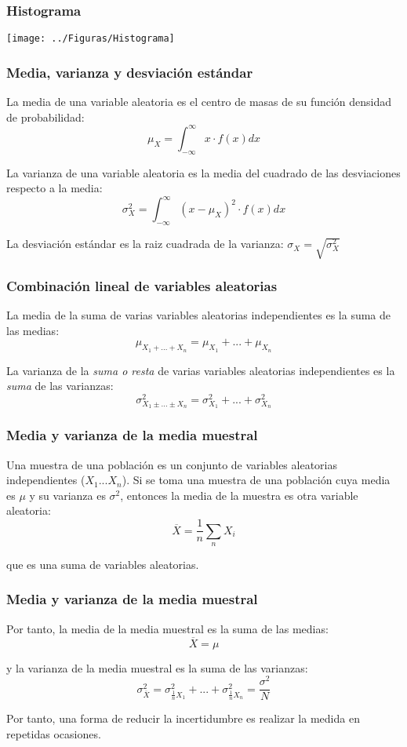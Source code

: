 \documentclass[serif, xcolor=dvipsnames]{beamer}
\begin{document}
\begin{frame}[plain]
\frametitle{Histograma}

\begin{center}
\texttt{[image: ../Figuras/Histograma]}
\par\end{center}


\end{frame}
\begin{frame}
\frametitle{Media, varianza y desviación estándar}

La media de una variable aleatoria es el centro de masas de su función
densidad de probabilidad:\[
\mu_{X}=\int_{-\infty}^{\infty}x\cdot f(x)dx\]


La varianza de una variable aleatoria es la media del cuadrado de
las desviaciones respecto a la media:\[
\sigma_{X}^{2}=\int_{-\infty}^{\infty}(x-\mu_{X})^{2}\cdot f(x)dx\]


La desviación estándar es la raiz cuadrada de la varianza: $\sigma_{X}=\sqrt{\sigma_{X}^2}$


\end{frame}
\begin{frame}
\frametitle{Combinación lineal de variables aleatorias}

La media de la suma de varias variables aleatorias independientes
es la suma de las medias:\[
\mu_{X_{1}+...+X_{n}}=\mu_{X_{1}}+...+\mu_{X_{n}}\]


La varianza de la \emph{suma o resta} de varias variables aleatorias
independientes es la \emph{suma} de las varianzas:\[
\sigma_{X_{1}\pm...\pm X_{n}}^{2}=\sigma_{X_{1}}^{2}+...+\sigma_{X_{n}}^{2}\]



\end{frame}
\begin{frame}
\frametitle{Media y varianza de la media muestral}

Una muestra de una población es un conjunto de variables aleatorias
independientes ($X_{1}...X_{n}$). Si se toma una muestra de una población
cuya media es $\mu$ y su varianza es $\sigma^{2}$, entonces la media
de la muestra es otra variable aleatoria:\[
\overline{X}=\frac{1}{n}\sum_{n}X_{i}\]


que es una suma de variables aleatorias. 


\end{frame}
\begin{frame}
\frametitle{Media y varianza de la media muestral}

Por tanto, la media de la media muestral es la suma de las medias:
\[
\overline{X}=\mu\]


y la varianza de la media muestral es la suma de las varianzas:\[
\sigma_{\overline{X}}^{2}=\sigma_{\frac{1}{n}X_{1}}^{2}+...+\sigma_{\frac{1}{n}X_{n}}^{2}=\frac{\sigma^2}{N}\]


Por tanto, una forma de reducir la incertidumbre es realizar la medida
en repetidas ocasiones.


\end{frame}
\end{document}
